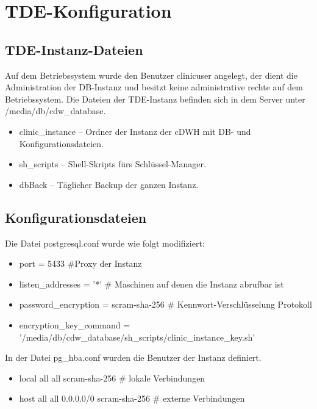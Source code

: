 	\section{\ac{TDE}-Konfiguration} 
	
    \subsection{\ac{TDE}-Instanz-Dateien}
    Auf dem Betriebssystem wurde den Benutzer clinicuser angelegt, der dient die Administration der \ac{DB}-Instanz und besitzt keine administrative rechte auf dem Betriebssystem.
    Die Dateien der \ac{TDE}-Instanz befinden sich in dem Server unter /media/db/cdw\_database.
    \begin{itemize}
    	\item clinic\_instance -- Ordner der Instanz der \ac{cDWH} mit \ac{DB}- und Konfigurationsdateien.
    	\item sh\_scripts -- Shell-Skripts fürs Schlüssel-Manager.
    	\item dbBack -- Täglicher Backup der ganzen Instanz.
    \end{itemize}

    \subsection{Konfigurationsdateien}
    Die Datei postgresql.conf wurde wie folgt modifiziert:
    \begin{itemize}
    	\item port = 5433 \#Proxy der Instanz
    	\item listen\_addresses = '*' \# Maschinen auf denen die Instanz abrufbar ist
    	\item password\_encryption = scram-sha-256 \# Kennwort-Verschlüsselung Protokoll
    	\item encryption\_key\_command = '/media/db/cdw\_database/sh\_scripts/clinic\_instance\_key.sh'
    \end{itemize}
	In der Datei pg\_hba.conf wurden die Benutzer der Instanz definiert.
	\begin{itemize}
		\item local   all     all                      scram-sha-256 \# lokale Verbindungen
		\item host    all             all              0.0.0.0/0         scram-sha-256 \# externe Verbindungen
	\end{itemize}
